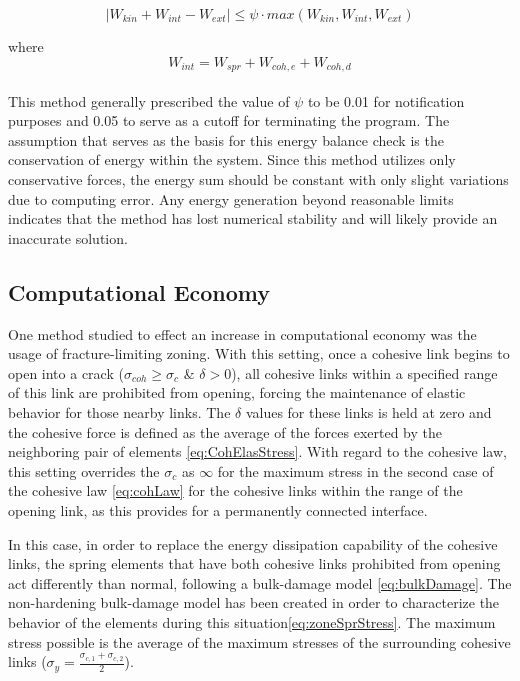 \documentclass[12pt,a4paper]{article}
\begin{document}
\begin{equation}
|W_{kin}+W_{int}-W_{ext}| \leq \psi \cdot max(W_{kin}, W_{int}, W_{ext})
\label{eq:energyBalance}
\end{equation}

where
\begin{equation}
W_{int} = W_{spr} + W_{coh, e} + W_{coh, d}
\label{eq:Wint}
\end{equation}\\

This method generally prescribed the value of $\psi$ to be 0.01 for notification purposes and 0.05 to serve as a cutoff for terminating the program. The assumption that serves as the basis for this energy balance check is the conservation of energy within the system. Since this method utilizes only conservative forces, the energy sum should be constant with only slight variations due to computing error. Any energy generation beyond reasonable limits indicates that the method has lost numerical stability and will likely provide an inaccurate solution.

\subsection{Computational Economy}

One method studied to effect an increase in computational economy was the usage of fracture-limiting zoning. With this setting, once a cohesive link begins to open into a crack ($\sigma_{coh} \geq \sigma_{c}$ \& $\delta > 0$), all cohesive links within a specified range of this link are prohibited from opening, forcing the maintenance of elastic behavior for those nearby links. The $\delta$ values for these links is held at zero and the cohesive force is defined as the average of the forces exerted by the neighboring pair of elements \eqref{eq:CohElasStress}. With regard to the cohesive law, this setting overrides the $\sigma_{c}$ as $\infty$ for the maximum stress in the second case of the cohesive law \eqref{eq:cohLaw} for the cohesive links within the range of the opening link, as this provides for a permanently connected interface.

In this case, in order to replace the energy dissipation capability of the cohesive links, the spring elements that have both cohesive links prohibited from opening act differently than normal, following a bulk-damage model \eqref{eq:bulkDamage}. The non-hardening bulk-damage model has been created in order to characterize the behavior of the elements during this situation\eqref{eq:zoneSprStress}. The maximum stress possible is the average of the maximum stresses of the surrounding cohesive links ($\sigma_{y} = \frac{\sigma_{c,1}+\sigma_{c,2}}{2}$).
\end{document}
